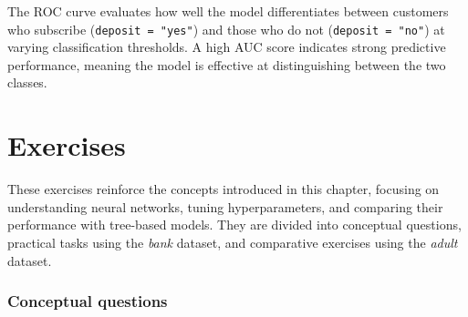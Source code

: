 \documentclass[
]{book}
\newcommand{\passthrough}[1]{#1}
\theoremstyle{definition}
\theoremstyle{definition}
\theoremstyle{definition}
\theoremstyle{definition}
\theoremstyle{remark}
\begin{document}
The ROC curve evaluates how well the model differentiates between customers who subscribe (\passthrough{\lstinline!deposit = "yes"!}) and those who do not (\passthrough{\lstinline!deposit = "no"!}) at varying classification thresholds. A high AUC score indicates strong predictive performance, meaning the model is effective at distinguishing between the two classes.

\section*{Exercises}\label{exercises-8}

These exercises reinforce the concepts introduced in this chapter, focusing on understanding neural networks, tuning hyperparameters, and comparing their performance with tree-based models. They are divided into conceptual questions, practical tasks using the \emph{bank} dataset, and comparative exercises using the \emph{adult} dataset.

\subsubsection*{Conceptual questions}\label{conceptual-questions-10}
\end{document}
